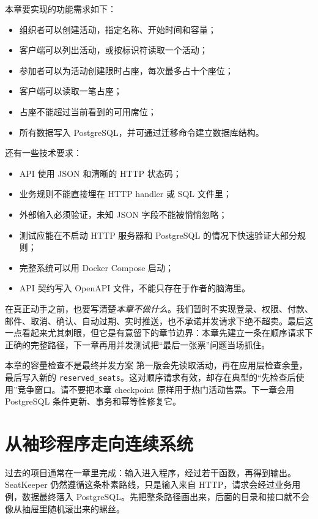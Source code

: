 本章要实现的功能需求如下：

\begin{itemize}
  \item 组织者可以创建活动，指定名称、开始时间和容量；
  \item 客户端可以列出活动，或按标识符读取一个活动；
  \item 参加者可以为活动创建限时占座，每次最多占十个座位；
  \item 客户端可以读取一笔占座；
  \item 占座不能超过当前看到的可用席位；
  \item 所有数据写入 PostgreSQL，并可通过迁移命令建立数据库结构。
\end{itemize}

还有一些技术要求：

\begin{itemize}
  \item API 使用 JSON 和清晰的 HTTP 状态码；
  \item 业务规则不能直接埋在 HTTP handler 或 SQL 文件里；
  \item 外部输入必须验证，未知 JSON 字段不能被悄悄忽略；
  \item 测试应能在不启动 HTTP 服务器和 PostgreSQL 的情况下快速验证大部分规则；
  \item 完整系统可以用 Docker Compose 启动；
  \item API 契约写入 OpenAPI 文件，不能只存在于作者的脑海里。
\end{itemize}

在真正动手之前，也要写清楚\emph{本章不做什么}。我们暂时不实现登录、权限、付款、邮件、取消、确认、自动过期、实时推送，也不承诺并发请求下绝不超卖。最后这一点看起来尤其刺眼，但它是有意留下的章节边界：本章先建立一条在顺序请求下正确的完整路径，下一章再用并发测试把“最后一张票”问题当场抓住。

\begin{warningbox}{本章的容量检查不是最终并发方案}
第一版会先读取活动，再在应用层检查余量，最后写入新的 \texttt{reserved\_seats}。这对顺序请求有效，却存在典型的“先检查后使用”竞争窗口。请不要把本章 checkpoint 原样用于热门活动售票。下一章会用 PostgreSQL 条件更新、事务和幂等性修复它。
\end{warningbox}

\section{从袖珍程序走向连续系统}

过去的项目通常在一章里完成：输入进入程序，经过若干函数，再得到输出。SeatKeeper 仍然遵循这条朴素路线，只是输入来自 HTTP，请求会经过业务用例，数据最终落入 PostgreSQL。先把整条路径画出来，后面的目录和接口就不会像从抽屉里随机滚出来的螺丝。

